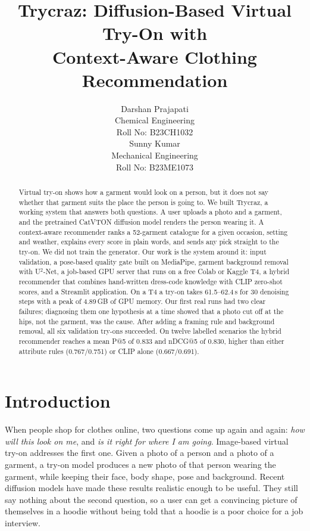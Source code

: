 \documentclass{article}
\title{Trycraz: Diffusion-Based Virtual Try-On with\\Context-Aware Clothing Recommendation}
\author{%
  Darshan Prajapati \\
  Chemical Engineering \\
  Roll No: B23CH1032 \\
  \And
  Sunny Kumar \\
  Mechanical Engineering \\
  Roll No: B23ME1073 \\
}
\newcommand{\unet}{U$^2$-Net}
\begin{document}
\maketitle

\vspace{-1.2em}
\begin{center}
\setlength{\fboxsep}{6pt}%
\end{center}
\vspace{0.4em}

\begin{abstract}
Virtual try-on shows how a garment would look on a person, but it does not say whether that garment
suits the place the person is going to. We built Trycraz, a working system that answers both questions.
A user uploads a photo and a garment, and the pretrained CatVTON diffusion model renders the person
wearing it. A context-aware recommender ranks a 52-garment catalogue for a given occasion, setting and
weather, explains every score in plain words, and sends any pick straight to the try-on. We did not
train the generator. Our work is the system around it: input validation, a pose-based quality gate
built on MediaPipe, garment background removal with \unet, a job-based GPU server that runs on a free
Colab or Kaggle T4, a hybrid recommender that combines hand-written dress-code knowledge with CLIP
zero-shot scores, and a Streamlit application. On a T4 a try-on takes 61.5--62.4\,s for 30 denoising
steps with a peak of 4.89\,GB of GPU memory. Our first real runs had two clear failures; diagnosing
them one hypothesis at a time showed that a photo cut off at the hips, not the garment, was the cause.
After adding a framing rule and background removal, all six validation try-ons succeeded. On twelve
labelled scenarios the hybrid recommender reaches a mean P@5 of 0.833 and nDCG@5 of 0.830, higher
than either attribute rules (0.767/0.751) or CLIP alone (0.667/0.691).
\end{abstract}

\section{Introduction}
\label{sec:intro}

When people shop for clothes online, two questions come up again and again: \emph{how will this look
on me}, and \emph{is it right for where I am going}. Image-based virtual try-on addresses the first
one. Given a photo of a person and a photo of a garment, a try-on model produces a new photo of that
person wearing the garment, while keeping their face, body shape, pose and background. Recent
diffusion models have made these results realistic enough to be useful. They still say nothing about
the second question, so a user can get a convincing picture of themselves in a hoodie without being
told that a hoodie is a poor choice for a job interview.
\end{document}
